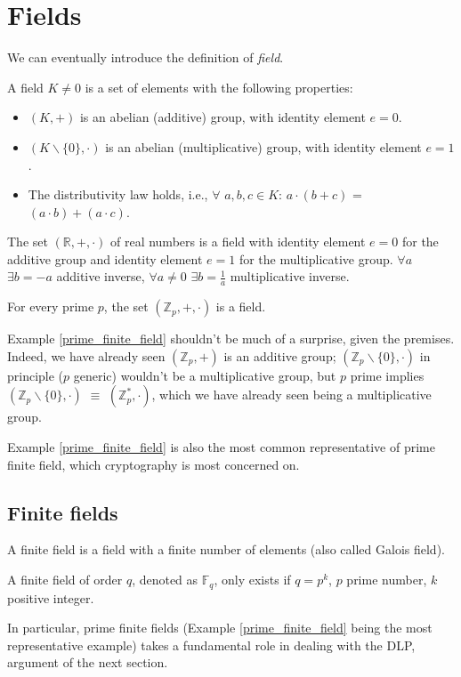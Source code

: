 \section{Fields}
We can eventually introduce the definition of \textit{field}.
\begin{mydef}
    A field $K\neq0$ is a set of elements with the following properties:
    \begin{itemize}
        \item $(K,+)$ is an abelian (additive) group, with identity element $e=0$.
        \item $(K\backslash\{0\},\cdot)$ is an abelian (multiplicative) group, with identity element $e=1$.
        \item The distributivity law holds, i.e., $\forall$ $a,b,c \in K$: $a \cdot (b+c)$ = $(a\cdot b) + (a\cdot c)$.
    \end{itemize}
\end{mydef}
\begin{myexample}
    The set $(\mathbb{R},+,\cdot)$ of real numbers is a field with identity element $e=0$ for the additive group and identity element $e=1$ for the multiplicative group. $\forall a$ $\exists b = -a$ additive inverse, $\forall a\neq 0$ $\exists b =\frac{1}{a}$ multiplicative inverse.
\end{myexample}
\begin{myexample}
\label{prime_finite_field}
    For every prime $p$, the set $(\mathbb{Z}_p,+,\cdot)$ is a field.
\end{myexample}
\begin{myrem}
    Example \ref{prime_finite_field} shouldn't be much of a surprise, given the premises. Indeed, we have already seen $(\mathbb{Z}_p,+)$ is an additive group; $(\mathbb{Z}_p\backslash\{0\},\cdot)$ in principle ($p$ generic) wouldn't be a multiplicative group, but $p$ prime implies $(\mathbb{Z}_p\backslash\{0\},\cdot)$ $\equiv$ $(\mathbb{Z}_p^{*},\cdot)$, which we have already seen being a multiplicative group.
\end{myrem}
\begin{myrem}
    Example \ref{prime_finite_field} is also the most common representative of prime finite field, which cryptography is most concerned on.
\end{myrem}
\subsection{Finite fields}
\begin{mydef}
    A finite field is a field with a finite number of elements (also called Galois field).
\end{mydef}
\begin{mytheorem}
    A finite field of order $q$, denoted as $\mathbb{F}_q$, only exists if $q = p^k$, $p$ prime number, $k$ positive integer.
\end{mytheorem}
\noindent
In particular, prime finite fields (Example \ref{prime_finite_field} being the most representative example) takes a fundamental role in dealing with the DLP, argument of the next section.
